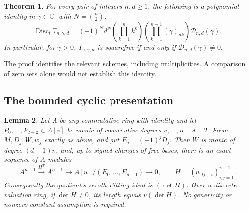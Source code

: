 \documentclass[11pt]{article}
\newtheorem{theorem}{Theorem}
\newtheorem{lemma}[theorem]{Lemma}
\begin{document}
\begin{theorem}\label{thm:discriminant}
For every pair of integers $n,d\ge1$, the following is a polynomial
identity in $\gamma\in\mathbb C$, with $N=\binom n2$:
\[
 \operatorname{Disc}_t T_{n,\gamma,d}
 =(-1)^N d^N
   \left(\prod_{k=1}^n k^k\right)
   \left(\prod_{k=1}^{n-1}(\gamma)_{dk}\right)
        \mathcal D_{n,d}(\gamma).                           \tag{D}
\]
In particular, for $\gamma>0$, $T_{n,\gamma,d}$ is squarefree if and
only if $\mathcal D_{n,d}(\gamma)\ne0$.
\end{theorem}
The proof identifies the relevant schemes, including multiplicities.
A comparison of zero sets alone would not establish this identity.

\subsection*{The bounded cyclic presentation}
\begin{lemma}\label{lem:general-fitting}
Let $A$ be any commutative ring with identity and let
$P_0,\ldots,P_{d-2}\in A[z]$ be monic of consecutive degrees
$n,\ldots,n+d-2$. Form $M,D_j,W,w_j$ exactly as above, and put
$E_j=(-1)^jD_j$.
Then $W$ is monic of degree $(d-1)n$, and, up to signed changes
of free bases, there is an exact sequence of $A$-modules
\[
 A^{n-1}\xrightarrow{H^T}A^{n-1}\longrightarrow
 A[u]/(E_0,\ldots,E_{d-1})\longrightarrow0,
 \qquad H=(w_{dj-i})_{i,j=1}^{n-1}.
\]
Consequently the quotient's zeroth Fitting ideal is $(\det H)$.
Over a discrete valuation ring, if $\det H\ne0$, its length equals
$v(\det H)$. No genericity or nonzero-constant assumption is required.
\end{lemma}
\end{document}
